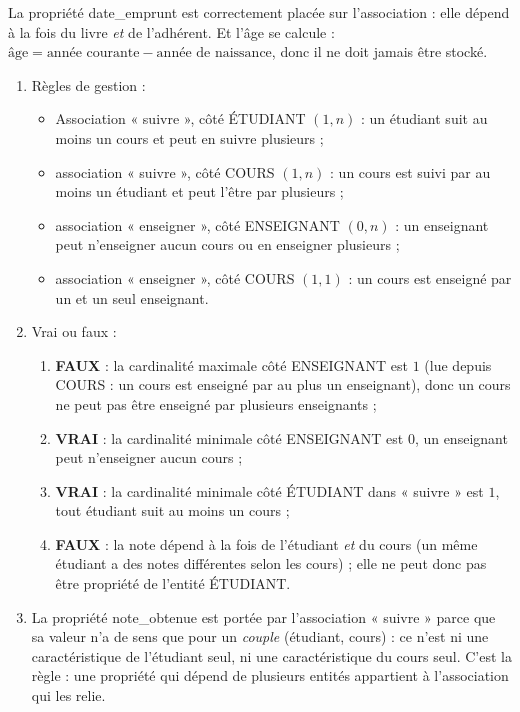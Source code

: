 \documentclass[11pt]{article}
\begin{document}
\begin{attention}
La propriété date\_emprunt est correctement placée sur l'association : elle dépend à la fois du livre \emph{et} de l'adhérent. Et l'âge se calcule : $\text{âge} = \text{année courante} - \text{année de naissance}$, donc il ne doit jamais être stocké.
\end{attention}

\begin{corrige}
\begin{enumerate}
\item Règles de gestion :
\begin{itemize}
\item Association « suivre », côté ÉTUDIANT $(1, n)$ : un étudiant suit au moins un cours et peut en suivre plusieurs ;
\item association « suivre », côté COURS $(1, n)$ : un cours est suivi par au moins un étudiant et peut l'être par plusieurs ;
\item association « enseigner », côté ENSEIGNANT $(0, n)$ : un enseignant peut n'enseigner aucun cours ou en enseigner plusieurs ;
\item association « enseigner », côté COURS $(1, 1)$ : un cours est enseigné par un et un seul enseignant.
\end{itemize}
\item Vrai ou faux :
\begin{enumerate}
\item \textbf{FAUX} : la cardinalité maximale côté ENSEIGNANT est $1$ (lue depuis COURS : un cours est enseigné par au plus un enseignant), donc un cours ne peut pas être enseigné par plusieurs enseignants ;
\item \textbf{VRAI} : la cardinalité minimale côté ENSEIGNANT est $0$, un enseignant peut n'enseigner aucun cours ;
\item \textbf{VRAI} : la cardinalité minimale côté ÉTUDIANT dans « suivre » est $1$, tout étudiant suit au moins un cours ;
\item \textbf{FAUX} : la note dépend à la fois de l'étudiant \emph{et} du cours (un même étudiant a des notes différentes selon les cours) ; elle ne peut donc pas être propriété de l'entité ÉTUDIANT.
\end{enumerate}
\item La propriété note\_obtenue est portée par l'association « suivre » parce que sa valeur n'a de sens que pour un \emph{couple} (étudiant, cours) : ce n'est ni une caractéristique de l'étudiant seul, ni une caractéristique du cours seul. C'est la règle : une propriété qui dépend de plusieurs entités appartient à l'association qui les relie.
\end{enumerate}
\end{corrige}
\end{document}
